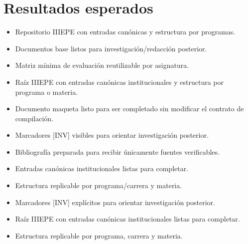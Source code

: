 \documentclass[12pt]{article}
\begin{document}
\section*{Resultados esperados}
\begin{itemize}[leftmargin=*]
  \item Repositorio IIIEPE con entradas canónicas y estructura por programas.
  \item Documentos base listos para investigación/redacción posterior.
  \item Matriz mínima de evaluación reutilizable por asignatura.
  \item Raíz IIIEPE con entradas canónicas institucionales y estructura por programa o materia.
  \item Documento maqueta listo para ser completado sin modificar el contrato de compilación.
  \item Marcadores [INV] visibles para orientar investigación posterior.
  \item Bibliografía preparada para recibir únicamente fuentes verificables.
  \item Entradas canónicas institucionales listas para completar.
  \item Estructura replicable por programa/carrera y materia.
  \item Marcadores [INV] explícitos para orientar investigación posterior.
  \item Raíz IIIEPE con entradas canónicas institucionales listas para completar.
  \item Estructura replicable por programa, carrera y materia.
\end{itemize}
\end{document}
